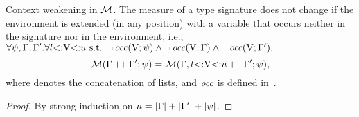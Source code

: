 \begin{lemma}{Context weakening in $\operatorname{\mathcal{M}}$.}%
\label{lem:msr-weakening}
    The measure of a type signature does not change if the environment
    is extended (in any position) with a variable that occurs neither
    in the signature nor in the environment, i.e.,
    $\forall \psi, \Gamma, \Gamma'. 
    \forall l{\operatorname{<:}}\mathrm{V}{\operatorname{<:}}u \text{ s.t. } 
    \lnot \operatorname{\mathit{occ}}(\mathrm{V};\psi) \land 
    \lnot \operatorname{\mathit{occ}}(\mathrm{V};\Gamma) \land \lnot \operatorname{\mathit{occ}}(\mathrm{V};\Gamma').$
    \[\operatorname{\mathcal{M}}(\Gamma\operatorname{+\!+}\Gamma';\psi) = 
        \operatorname{\mathcal{M}}(\Gamma,l{\operatorname{<:}}\mathrm{V}{\operatorname{<:}}u\operatorname{+\!+}\Gamma';\psi),\]
    where  denotes the concatenation of lists,
    and $\operatorname{\mathit{occ}}$ is defined in~.
\end{lemma}
\begin{proof}
    By strong induction on $n = |\Gamma| + |\Gamma'| + |\psi|$.
\end{proof}


